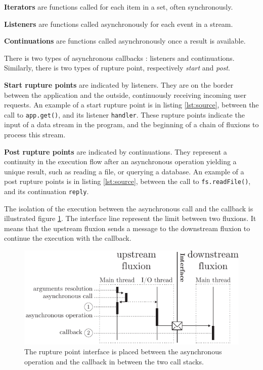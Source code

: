 \textbf{Iterators} are functions called for each item in a set, often synchronously.

\textbf{Listeners} are functions called asynchronously for each event in a stream.

\textbf{Continuations} are functions called asynchronously once a result is available.

There is two types of asynchronous callbacks : listeners and continuations.
Similarly, there is two types of rupture point, respectively \textit{start} and \textit{post}.

\textbf{Start rupture points} are indicated by listeners. They are on the border between the application and the outside, continuously receiving incoming user requests.
An example of a start rupture point is in listing \ref{lst:source}, between the call to \texttt{app.get()}, and its listener \texttt{handler}.
These rupture points indicate the input of a data stream in the program, and the beginning of a chain of fluxions to process this stream.

\textbf{Post rupture points} are indicated by continuations.
They represent a continuity in the execution flow after an asynchronous operation yielding a unique result, such as reading a file, or querying a database.
An example of a post rupture points is in listing \ref{lst:source}, between the call to \texttt{fs.readFile()}, and its continuation \texttt{reply}.


The isolation of the execution between the asynchronous call and the callback is illustrated figure \ref{fig:basicrp}. The interface line represent the limit between two fluxions. It means that the upstream fluxion sends a message to the downstream fluxion to continue the execution with the callback.

\begin{figure}[h!]
\begin{center}
  \includegraphics[width=\linewidth]{ressources/basicrp.pdf}
  \caption{The rupture point interface is placed between the asynchronous operation and the callback in between the two call stacks.}
  \label{fig:basicrp}
\end{center}
\end{figure}

